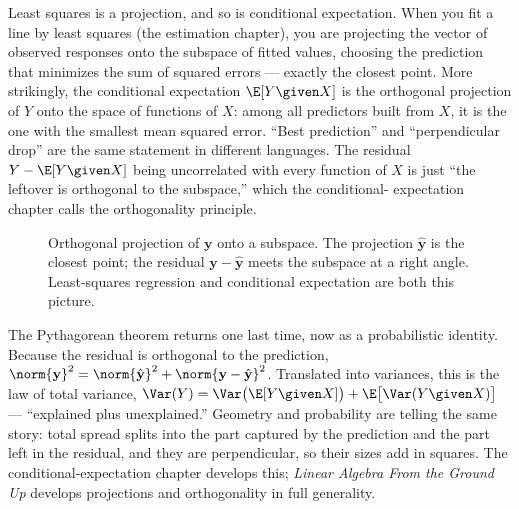 \begin{happeningbox}
Least squares is a projection, and so is conditional expectation. When you fit a line by least
squares (the estimation chapter), you are projecting the vector of observed responses onto the subspace
of fitted values, choosing the prediction that minimizes the sum of squared errors --- exactly the
closest point. More strikingly, the conditional expectation $\E[Y\given X]$ is the orthogonal
projection of $Y$ onto the space of functions of $X$: among all predictors built from $X$, it is the
one with the smallest mean squared error. ``Best prediction'' and ``perpendicular drop'' are the same
statement in different languages. The residual $Y-\E[Y\given X]$ being uncorrelated with every
function of $X$ is just ``the leftover is orthogonal to the subspace,'' which the conditional-
expectation chapter calls the orthogonality principle.
\end{happeningbox}

\begin{figure}[H]
\centering
{}
\caption{Orthogonal projection of $\mathbf{y}$ onto a subspace. The projection $\hat{\mathbf{y}}$ is
the closest point; the residual $\mathbf{y}-\hat{\mathbf{y}}$ meets the subspace at a right angle.
Least-squares regression and conditional expectation are both this picture.}
\label{chAcla:fig-projection}
\end{figure}

\begin{connectionbox}
The Pythagorean theorem returns one last time, now as a probabilistic identity. Because the residual
is orthogonal to the prediction, $\norm{\mathbf{y}}^2 = \norm{\hat{\mathbf{y}}}^2 +
\norm{\mathbf{y}-\hat{\mathbf{y}}}^2$. Translated into variances, this is the law of total variance,
$\Var(Y) = \Var\big(\E[Y\given X]\big) + \E\big[\Var(Y\given X)\big]$ --- ``explained plus
unexplained.'' Geometry and probability are telling the same story: total spread splits into the part
captured by the prediction and the part left in the residual, and they are perpendicular, so their
sizes add in squares. The conditional-expectation chapter develops this; \emph{Linear Algebra From the
Ground Up} develops projections and orthogonality in full generality.
\end{connectionbox}

